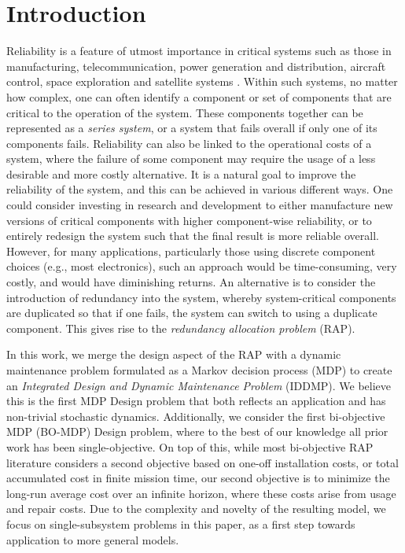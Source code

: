 \documentclass[11pt,authoryear,a4paper]{article}
\theoremstyle{definition}
\begin{document}
\section{Introduction}

Reliability is a feature of utmost importance in critical systems such as those in manufacturing, telecommunication, power generation and distribution, aircraft control, space exploration and satellite systems \citep{KIM201864}. Within such systems, no matter how complex, one can often identify a component or set of components that are critical to the operation of the system. These components together can be represented as a \emph{series system}, or a system that fails overall if only one of its components fails. Reliability can also be linked to the operational costs of a system, where the failure of some component may require the usage of a less desirable and more costly alternative. It is a natural goal to improve the reliability of the system, and this can be achieved in various different ways. One could consider investing in research and development to either manufacture new versions of critical components with higher component-wise reliability, or to entirely redesign the system such that the final result is more reliable overall. However, {\color{black}for many applications, particularly those using discrete component choices (e.g., most electronics),} such an approach would be time-consuming, very costly, and would have diminishing returns. An alternative is to consider the introduction of redundancy into the system, whereby system-critical components are duplicated so that if one fails, the system can switch to using a duplicate component. This gives rise to the \emph{redundancy allocation problem} (RAP).

In this work, we merge the design aspect of the RAP with a dynamic maintenance problem formulated as a Markov decision process (MDP) to create an \emph{Integrated Design and Dynamic Maintenance Problem} (IDDMP). We believe this is the first MDP Design problem that both reflects an application and has non-trivial stochastic dynamics. Additionally, we consider the first bi-objective MDP (BO-MDP) Design problem, where to the best of our knowledge all prior work has been single-objective. On top of this, while most bi-objective RAP literature considers a second objective based on one-off installation costs, or total accumulated cost in finite mission time, our second objective is to minimize the long-run average cost over an infinite horizon, where these costs arise from usage and repair costs. Due to the complexity and novelty of the resulting model, we focus on single-subsystem problems in this paper, as a first step towards application to more general models. %
\end{document}
